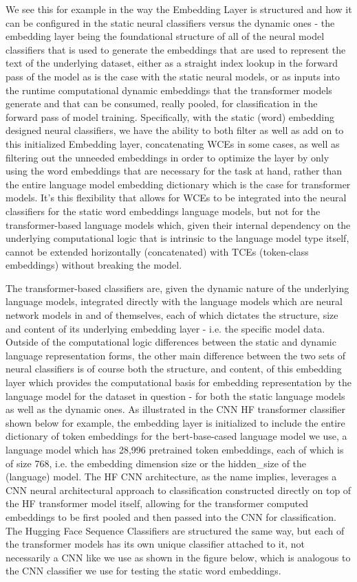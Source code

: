 \documentclass[final]{clv2025}
\begin{document}
We see this for example in the way the Embedding Layer is structured and how it can be configured in the static neural classifiers versus the dynamic ones - the embedding layer being the foundational structure of all of the neural model classifiers that is used to generate the embeddings that are used to represent the text of the underlying dataset, either as a straight index lookup in the forward pass of the model as is the case with the static neural models, or as inputs into the runtime computational dynamic embeddings that the transformer models generate and that can be consumed, really pooled, for classification in the forward pass of model training. Specifically, with the static (word) embedding designed neural classifiers, we have the ability to both filter as well as add on to this initialized Embedding layer, concatenating WCEs in some cases, as well as filtering out the unneeded embeddings in order to optimize the layer by only using the word embeddings that are necessary for the task at hand, rather than the entire language model embedding dictionary which is the case for transformer models. It's this flexibility that allows for WCEs to be integrated into the neural classifiers for the static word embeddings language models, but not for the transformer-based language models which, given their internal dependency on the underlying computational logic that is intrinsic to the language model type itself, cannot be extended horizontally (concatenated) with TCEs (token-class embeddings) without breaking the model.

The transformer-based classifiers are, given the dynamic nature of the underlying language models, integrated directly with the language models which are neural network models in and of themselves, each of which dictates the structure, size and content of its underlying embedding layer - i.e. the specific model data. Outside of the computational logic differences between the static and dynamic language representation forms, the other main difference between the two sets of neural classifiers is of course both the structure, and content, of this embedding layer which provides the computational basis for embedding representation by the language model for the dataset in question - for both the static language models as well as the dynamic ones. As illustrated in the CNN HF transformer classifier shown below for example, the embedding layer is initialized to include the entire dictionary of token embeddings for the bert-base-cased language model we use, a language model which has 28,996 pretrained token embeddings, each of which is of size 768, i.e. the embedding dimension size or the hidden\_size of the (language) model. The HF CNN architecture, as the name implies, leverages a CNN neural architectural approach to classification constructed directly on top of the HF transformer model itself, allowing for the transformer computed embeddings to be first pooled and then passed into the CNN for classification. The Hugging Face Sequence Classifiers are structured the same way, but each of the transformer models has its own unique classifier attached to it, not necessarily a CNN like we use as shown in the figure below, which is analogous to the CNN classifier we use for testing the static word embeddings. 
\end{document}
